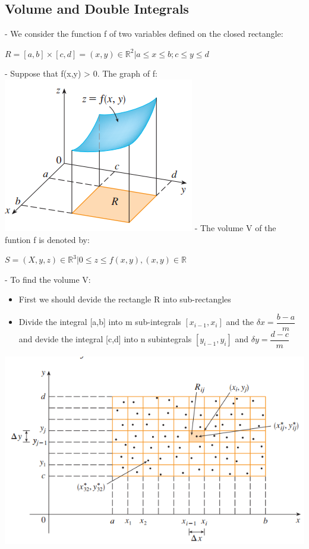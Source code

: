 \documentclass[12pt]{article}
\begin{document}
\subsection{Volume and Double Integrals}
- We consider the function f of two variables defined on the closed rectangle: \\
\begin{center}
$R = [a,b] \times [c,d] = {(x,y) \in \mathbb{R}^{2} | a \le x \le b; \mbox{} c \le y \le d }$
\end{center}
- Suppose that f(x,y) > 0. The graph of f: \\
\includegraphics[scale = 0.8]{hinh3}
\bigbreak
- The volume V of the funtion f is denoted by: \\
\begin{center}
$S = {(X,y,z) \in \mathbb{R}^{3} | 0 \le z \le f(x,y), (x,y) \in \mathbb{R}}$
\end{center}
- To find the volume V:\\
\begin{itemize}
	\item First we should devide the rectangle R into sub-rectangles
	\item Divide the integral [a,b] into m sub-integrals $[x_{i-1}, x_i]$ and the $\delta x = \dfrac{b-a}{m}$ and devide the integral [c,d] into n subintegrals $[y_{i-1}, y_{i}]$ and $\delta y = \dfrac{d - c}{m}$
\end{itemize}
\includegraphics[scale = 0.8]{hinh2}
\end{document}
